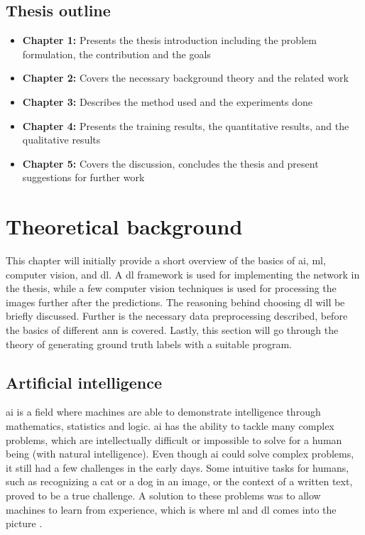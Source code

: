 \documentclass[USenglish]{ifimaster}  %
\begin{document}
\section{Thesis outline}
\begin{itemize}
    \item \textbf{Chapter 1:}
    \newline
    Presents the thesis introduction including the problem formulation, the contribution and the goals
    \item \textbf{Chapter 2:}
    \newline
    Covers the necessary background theory and the related work
    \item \textbf{Chapter 3:}
    \newline
    Describes the method used and the experiments done
    \item \textbf{Chapter 4:}
    \newline
    Presents the training results, the quantitative results, and the qualitative results
    \item \textbf{Chapter 5:}
    \newline
    Covers the discussion, concludes the thesis and present suggestions for further work
\end{itemize}


\chapter{Theoretical background}
This chapter will initially provide a short overview of the basics of \ac{ai}, \ac{ml}, computer vision, and \acf{dl}. A \ac{dl} framework is used for implementing the network in the thesis, while a few computer vision techniques is used for processing the images further after the predictions. The reasoning behind choosing \ac{dl} will be briefly discussed. Further is the necessary data preprocessing described, before the basics of different \ac{ann} is covered. Lastly, this section will go through the theory of generating ground truth labels with a suitable program.

\section{Artificial intelligence}
\ac{ai} is a field where machines are able to demonstrate intelligence through mathematics, statistics and logic. \ac{ai} has the ability to tackle many complex problems, which are intellectually difficult or impossible to solve for a human being (with natural intelligence). Even though \ac{ai} could solve complex problems, it still had a few challenges in the early days. Some intuitive tasks for humans, such as recognizing a cat or a dog in an image, or the context of a written text, proved to be a true challenge. A solution to these problems was to allow machines to learn from experience, which is where \ac{ml} and \ac{dl} comes into the picture \cite{The_holy_grail_of_DL}.
\end{document}
